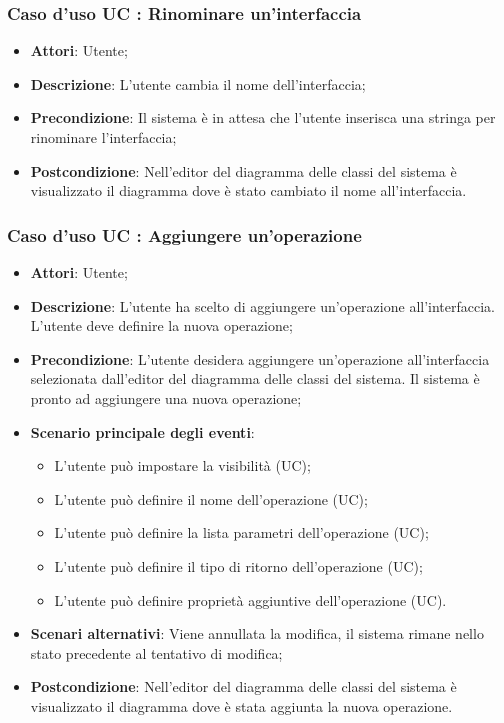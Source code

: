\documentclass[../AnalisiDeiRequisiti.tex]{subfiles}
\begin{document}
		\subsubsection{Caso d'uso UC : Rinominare un'interfaccia}
			\begin{itemize}
				\item \textbf{Attori}: Utente;
				\item \textbf{Descrizione}: L'utente cambia il nome dell'interfaccia;
				\item \textbf{Precondizione}: Il sistema è in attesa che l'utente inserisca
				una stringa per rinominare l'interfaccia;
				\item \textbf{Postcondizione}: Nell'editor del diagramma delle classi del
				sistema è visualizzato il diagramma dove è stato cambiato il nome
				all'interfaccia.
			\end{itemize}
		\subsubsection{Caso d'uso UC : Aggiungere un'operazione}
			\begin{itemize}
				\item \textbf{Attori}: Utente;
				\item \textbf{Descrizione}: L'utente ha scelto di aggiungere un'operazione
				all'interfaccia. L'utente deve definire la nuova operazione;
				\item \textbf{Precondizione}: L'utente desidera aggiungere un'operazione
				all'interfaccia selezionata dall'editor del diagramma delle classi del
				sistema. Il sistema è pronto ad aggiungere una nuova operazione;
				\item \textbf{Scenario principale degli eventi}:
					\begin{itemize}
						\item L'utente può impostare la visibilità (UC);
						\item L'utente può definire il nome dell'operazione (UC);
						\item L'utente può definire la lista parametri dell'operazione (UC);
						\item L'utente può definire il tipo di ritorno dell'operazione (UC);
						\item L'utente può definire proprietà aggiuntive dell'operazione (UC).
					\end{itemize}
				\item \textbf{Scenari alternativi}: Viene annullata la modifica, il sistema
				rimane nello stato precedente al tentativo di modifica;
				\item \textbf{Postcondizione}: Nell'editor del diagramma delle classi del
				sistema è visualizzato il diagramma dove è stata aggiunta la nuova operazione.
			\end{itemize}
\end{document}
